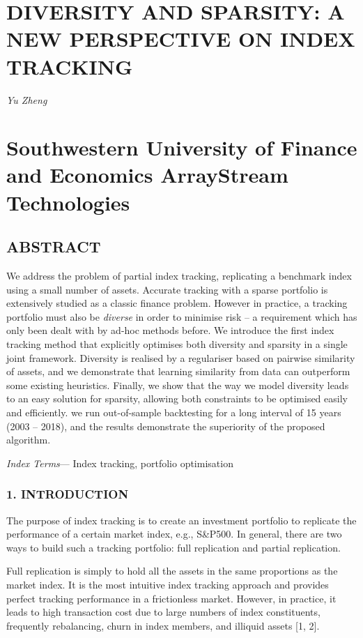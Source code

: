 \documentclass{article}
\begin{document}
\section{DIVERSITY AND SPARSITY: A NEW PERSPECTIVE ON INDEX TRACKING}

\textit{Yu Zheng}

\section{Southwestern University of Finance and Economics ArrayStream Technologies}

\subsection{ABSTRACT}

We address the problem of partial index tracking, replicating a benchmark index using a small number of assets. Accurate tracking with a sparse portfolio is extensively studied as a classic finance problem. However in practice, a tracking portfolio must also be \textit{diverse} in order to minimise risk – a requirement which has only been dealt with by ad-hoc methods before. We introduce the first index tracking method that explicitly optimises both diversity and sparsity in a single joint framework. Diversity is realised by a regulariser based on pairwise similarity of assets, and we demonstrate that learning similarity from data can outperform some existing heuristics. Finally, we show that the way we model diversity leads to an easy solution for sparsity, allowing both constraints to be optimised easily and efficiently. we run out-of-sample backtesting for a long interval of 15 years (2003 – 2018), and the results demonstrate the superiority of the proposed algorithm.

\textit{Index Terms}— Index tracking, portfolio optimisation

\subsubsection{1. INTRODUCTION}

The purpose of index tracking is to create an investment portfolio to replicate the performance of a certain market index, e.g., S\&P500. In general, there are two ways to build such a tracking portfolio: full replication and partial replication.

Full replication is simply to hold all the assets in the same proportions as the market index. It is the most intuitive index tracking approach and provides perfect tracking performance in a frictionless market. However, in practice, it leads to high transaction cost due to large numbers of index constituents, frequently rebalancing, churn in index members, and illiquid assets [1, 2].
\end{document}
